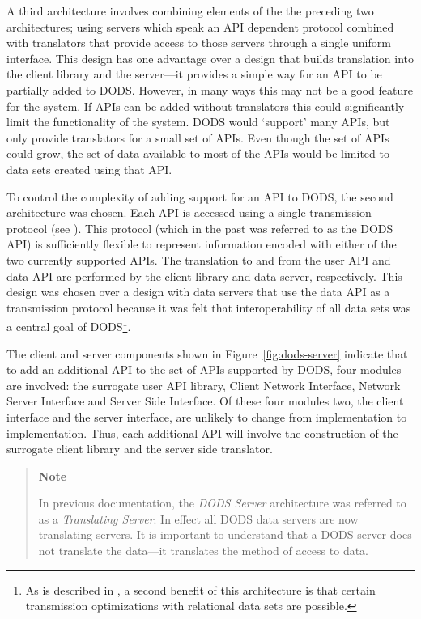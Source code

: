 A third architecture involves combining elements of the the preceding two
architectures; using servers which speak an API dependent protocol combined
with translators that provide access to those servers through a single
uniform interface. This design has one advantage over a design that builds
translation into the client library and the server---it provides a simple way
for an API to be partially added to DODS\@. However, in many ways this may not
be a good feature for the system. If APIs can be added without translators
this could significantly limit the functionality of the system. DODS would
`support' many APIs, but only provide translators for a small set of APIs.
Even though the set of APIs could grow, the set of data available to most of
the APIs would be limited to data sets created using that API\@.

To control the complexity of adding support for an API to DODS, the second
architecture was chosen. Each API is accessed using a single transmission
protocol (see \DTP). This protocol (which in the past was referred to as the
DODS API) is sufficiently flexible to represent information encoded with
either of the two currently supported APIs. The translation to and from the
user API and data API are performed by the client library and data server,
respectively. This design was chosen over a design with data servers that use
the data API as a transmission protocol because it was felt that
interoperability of all data sets was a central goal of DODS\footnote{As is
described in \DDD, a second benefit of this architecture is that certain
transmission optimizations with relational data sets are possible.}.

The client and server components shown in Figure~\ref{fig:dods-server}
indicate that to add an additional API to the set of APIs supported by DODS,
four modules are involved: the surrogate user API library, Client Network
Interface, Network Server Interface and Server Side Interface. Of these four
modules two, the client interface and the server interface, are unlikely to
change from implementation to implementation.  Thus, each additional API will
involve the construction of the surrogate client library and the server side
translator.

\begin{quote}
\small
\centerline{{\bf Note}}
In previous documentation, the {\em DODS Server\/} architecture was referred
to as a {\em Translating Server}. In effect all DODS data servers are now
translating servers. It is important to understand that a DODS server does
not translate the data---it translates the method of access to data.
\normalsize
\end{quote}

